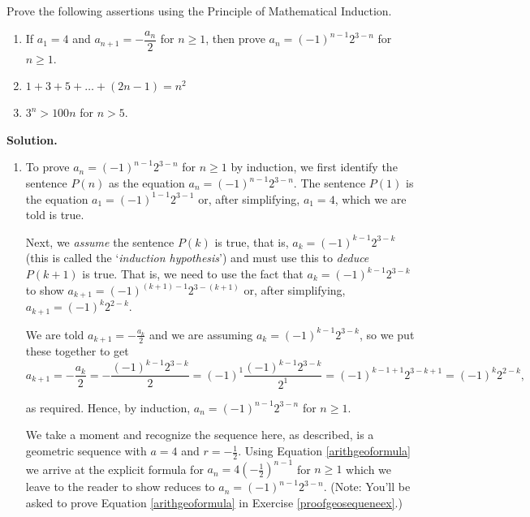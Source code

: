 \documentclass{ximera}
\begin{document}
\begin{ex} \label{inductionex01}  Prove the following assertions using the Principle of Mathematical Induction.

\begin{enumerate}


\item If $a_{1} = 4$ and $a_{n+1} = -\dfrac{a_{n}}{2}$ for $n \geq 1$,  then prove $a_{n} = (-1)^{n-1} 2^{3-n}$ for $n \geq 1$.

\item $1 + 3 + 5 + \ldots + (2n-1) = n^2$

\item  $3^{n} > 100n$ for $n > 5$.


\end{enumerate}


{\bf Solution.}

\begin{enumerate}

\item To prove $a_{n} = (-1)^{n-1} 2^{3-n}$ for $n \geq 1$ by induction, we first identify the sentence $P(n)$ as the equation $a_{n} = (-1)^{n-1} 2^{3-n}$.  The sentence $P(1)$ is the equation $a_{1} = (-1)^{1-1}2^{3-1}$ or, after simplifying,  $a_{1} = 4$, which we are told is true.
 
 Next, we \textit{assume} the sentence $P(k)$ is true, that is, $a_{k}= (-1)^{k-1} 2^{3-k}$ (this is called the `\textit{induction hypothesis}') and must use this to \textit{deduce} $P(k+1)$ is true. That is, we need to use the fact that  $a_{k}= (-1)^{k-1} 2^{3-k}$ to show $a_{k+1} = (-1)^{(k+1)-1}2^{3-(k+1)}$ or, after simplifying, $a_{k+1} = (-1)^{k} 2^{2-k}$.
 
 We are told $a_{k+1} =  -\frac{a_{k}}{2}$ and we are assuming $a_{k}= (-1)^{k-1} 2^{3-k}$, so we put these together to get \[ a_{k+1} =  -\frac{a_{k}}{2} =  -\frac{(-1)^{k-1} 2^{3-k}}{2}  = (-1)^{1} \frac{(-1)^{k-1} 2^{3-k}}{2^{1}}=  (-1)^{k-1+1} 2^{3-k+1} = (-1)^{k} 2^{2-k},\]
 
 as required.  Hence, by induction, $a_{n} = (-1)^{n-1} 2^{3-n}$ for $n \geq 1$.

We take a moment and recognize the sequence here, as described, is a geometric sequence with $a = 4$ and $r  = -\frac{1}{2}$.  Using Equation \ref{arithgeoformula} we arrive at the explicit formula for $a_{n} = 4 \left(- \frac{1}{2} \right)^{n-1}$ for $n \geq 1$ which we leave to the reader to show reduces to  $a_{n} = (-1)^{n-1} 2^{3-n}$.    (Note: You'll be asked to prove Equation \ref{arithgeoformula}  in Exercise \ref{proofgeosequeneex}.)


\end{enumerate}
\end{ex}
\end{document}
